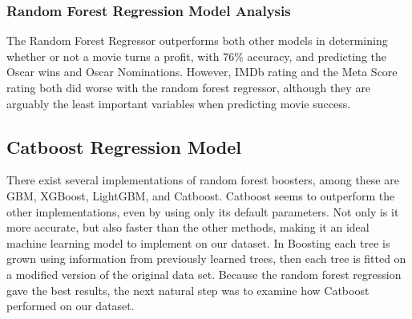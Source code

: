 \documentclass[11pt]{article}
\begin{document}

\hypertarget{random-forest-regression-model-analysis}{%
	\subsubsection{Random Forest Regression Model
		Analysis}\label{random-forest-regression-model-analysis}}

The Random Forest Regressor outperforms both other models in determining whether or not a movie turns a profit, with 76\% accuracy, and predicting the Oscar wins and Oscar Nominations. However, IMDb rating and the Meta Score rating both did worse with the random forest regressor, although they are arguably the least important variables when predicting movie success.

\hypertarget{catboost-regression-model}{%
	\subsection{Catboost Regression Model}\label{catboost-regression-model}}

There exist several implementations of random forest boosters, among these are GBM, XGBoost, LightGBM, and Catboost. Catboost seems to outperform the other implementations, even by using only its default parameters. Not only is it more accurate, but also faster than the other methods, making it an ideal machine learning model to implement on our dataset. In Boosting each tree is grown using information from previously learned trees, then each tree is fitted on a modified version of the original data set. Because the random forest regression gave the best results, the next natural step was to examine how Catboost performed on our dataset.

%
%
%
%
\end{document}
